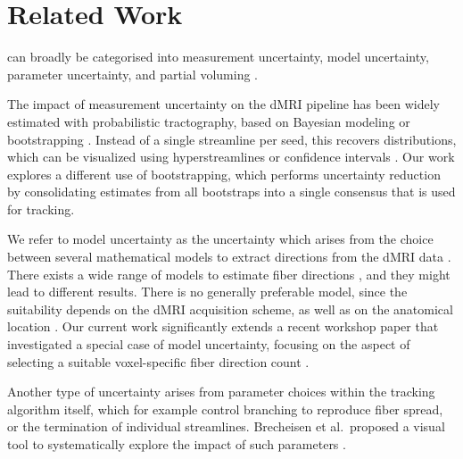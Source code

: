 \section{Related Work}\label{sec:related}
%
can broadly be categorised into measurement uncertainty,
model uncertainty, parameter uncertainty, and partial voluming \cite{Schultz:SciVisBook2014, Schultz:NBM2018, Gillmann:STAR2021}.

The impact of measurement
uncertainty on the dMRI pipeline has been widely estimated with probabilistic tractography, based on Bayesian modeling \cite{BEHRENS2007144} or bootstrapping \cite{Jones:2008}. Instead of a single streamline per seed, this recovers distributions,
which can be visualized using hyperstreamlines \cite{Jones:2005b,Jeurissen:2012, Wiens:2014}
or confidence intervals \cite{Brecheisen:2013,Siddiqui:2021}. Our work explores a different use of bootstrapping, which performs uncertainty reduction by consolidating estimates from all bootstraps into a single consensus that is used for tracking.

We refer to model uncertainty as the uncertainty which arises from the choice
between several mathematical models to extract directions from the dMRI data
\cite{Schultz:SciVisBook2014}. There exists a wide range of models to estimate
fiber directions \cite{Panagiotaki:2012}, and they might lead to different
results.  There is no generally preferable model, since the suitability depends  on the dMRI acquisition scheme, as well as on
the anatomical location \cite{Bretthorst:2004,Freidlin:2007}. Our current work significantly extends a recent workshop paper that investigated a special case of model uncertainty, focusing on the aspect of selecting a suitable voxel-specific fiber direction count \cite{Gruen:2021}. 

Another type of uncertainty arises from parameter choices within the tracking algorithm itself, which for example control branching to reproduce fiber spread, or the termination of individual streamlines. Brecheisen et al.\ proposed a visual tool to systematically explore the impact of such parameters
\cite{Brecheisen:2009}. 

